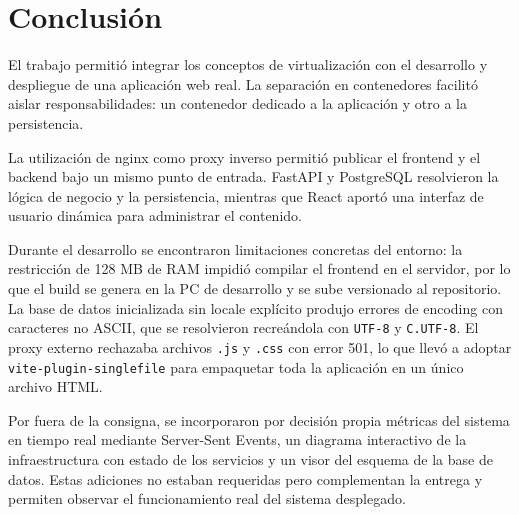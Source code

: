 \documentclass[twoside, 11pt, a4paper]{article}
\begin{document}
    \section{Conclusión}

    El trabajo permitió integrar los conceptos de virtualización con el desarrollo y despliegue de una aplicación web real. La separación en contenedores facilitó aislar responsabilidades: un contenedor dedicado a la aplicación y otro a la persistencia.

    La utilización de nginx como proxy inverso permitió publicar el frontend y el backend bajo un mismo punto de entrada. FastAPI y PostgreSQL resolvieron la lógica de negocio y la persistencia, mientras que React aportó una interfaz de usuario dinámica para administrar el contenido.

    Durante el desarrollo se encontraron limitaciones concretas del entorno: la restricción de 128 MB de RAM impidió compilar el frontend en el servidor, por lo que el build se genera en la PC de desarrollo y se sube versionado al repositorio. La base de datos inicializada sin locale explícito produjo errores de encoding con caracteres no ASCII, que se resolvieron recreándola con \texttt{UTF-8} y \texttt{C.UTF-8}. El proxy externo rechazaba archivos \texttt{.js} y \texttt{.css} con error 501, lo que llevó a adoptar \texttt{vite-plugin-singlefile} para empaquetar toda la aplicación en un único archivo HTML.

    Por fuera de la consigna, se incorporaron por decisión propia métricas del sistema en tiempo real mediante Server-Sent Events, un diagrama interactivo de la infraestructura con estado de los servicios y un visor del esquema de la base de datos. Estas adiciones no estaban requeridas pero complementan la entrega y permiten observar el funcionamiento real del sistema desplegado.
\end{document}
